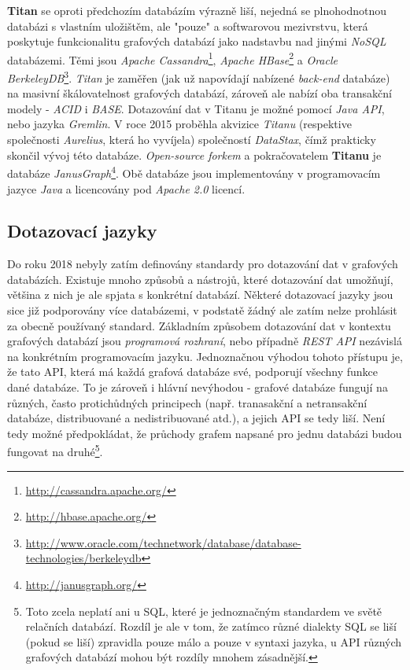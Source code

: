 \textbf{Titan} se oproti předchozím databázím výrazně liší, nejedná se plnohodnotnou databázi s vlastním uložištěm, ale "pouze" a softwarovou mezivrstvu, která poskytuje funkcionalitu grafových databází jako nadstavbu nad jinými \textit{NoSQL} databázemi. Těmi jsou \textit{Apache Cassandra}\footnote{\url{http://cassandra.apache.org/}}, \textit{Apache HBase}\footnote{\url{http://hbase.apache.org/}} a \textit{Oracle BerkeleyDB}\footnote{\url{http://www.oracle.com/technetwork/database/database-technologies/berkeleydb}}. 
\textit{Titan} je zaměřen (jak už napovídají nabízené \textit{back-end} databáze) na masivní škálovatelnost grafových databází, zároveň ale nabízí oba transakční modely - \textit{ACID} i \textit{BASE}. Dotazování dat v Titanu je možné pomocí \textit{Java API}, nebo jazyka \textit{Gremlin}. V roce 2015 proběhla akvizice \textit{Titanu} (respektive společnosti \textit{Aurelius}, která ho vyvíjela) společností \textit{DataStax}, čímž prakticky skončil vývoj této databáze. \textit{Open-source forkem} a pokračovatelem\cite{Datami17} \textbf{Titanu} je databáze \textit{JanusGraph}\footnote{\url{http://janusgraph.org/}}. Obě databáze jsou implementovány v programovacím jazyce \textit{Java} a licencovány pod \textit{Apache 2.0} licencí. 


\subsection{Dotazovací jazyky}
\label{sec:gdb-jazyky}

Do roku 2018 nebyly zatím definovány standardy pro dotazování dat v grafových databázích. Existuje mnoho způsobů a nástrojů, které dotazování dat umožňují, většina z nich je ale spjata s konkrétní databází. Některé dotazovací jazyky jsou sice již podporovány více databázemi, v podstatě žádný ale zatím nelze prohlásit za obecně používaný standard. Základním způsobem dotazování dat v kontextu grafových databází jsou \textit{programová rozhraní}, nebo případně \textit{REST API} nezávislá na konkrétním programovacím jazyku. Jednoznačnou výhodou tohoto přístupu je, že tato API, která má každá grafová databáze své, podporují všechny funkce dané databáze. To je zároveň i hlávní nevýhodou - grafové databáze fungují na různých, často protichůdných principech (např. tranasakční a netransakční databáze, distribuované a nedistribuované atd.), a jejich API se tedy liší. Není tedy možné předpokládat, že průchody grafem napsané pro jednu databázi budou fungovat na druhé\footnote{Toto zcela neplatí ani u SQL, které je jednoznačným standardem ve světě relačních databází. Rozdíl je ale v tom, že zatímco různé dialekty SQL se liší (pokud se liší) zpravidla pouze málo a pouze v syntaxi jazyka, u API různých grafových databází mohou být rozdíly mnohem zásadnější.}.   

